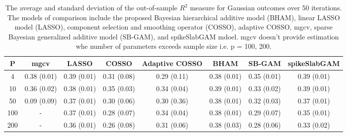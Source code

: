 \begin{table}[ht]
\centering
\begin{tabular}{cccccccc}
  \hline
P & mgcv & LASSO & COSSO & Adaptive COSSO & BHAM & SB-GAM & spikeSlabGAM \\ 
  \hline
  4 & 0.38 (0.01) & 0.39 (0.01) & 0.31 (0.08) & 0.29 (0.11) & 0.38 (0.01) & 0.35 (0.01) & 0.39 (0.01) \\ 
   10 & 0.36 (0.02) & 0.38 (0.01) & 0.35 (0.03) & 0.34 (0.04) & 0.39 (0.01) & 0.33 (0.02) & 0.39 (0.01) \\ 
   50 & 0.09 (0.09) & 0.37 (0.01) & 0.30 (0.06) & 0.30 (0.36) & 0.38 (0.01) & 0.32 (0.03) & 0.37 (0.01) \\ 
  100 & - & 0.37 (0.01) & 0.28 (0.07) & 0.34 (0.04) & 0.38 (0.01) & 0.29 (0.07) & 0.35 (0.01) \\ 
  200 & - & 0.36 (0.01) & 0.26 (0.08) & 0.31 (0.06) & 0.38 (0.03) & 0.28 (0.06) & 0.33 (0.02) \\ 
   \hline
\end{tabular}
\caption{The average and standard deviation of the out-of-sample $R^2$ measure for
    Gaussian outcomes over 50 iterations. The models of comparison include the proposed
    Bayesian hierarchical additive model (BHAM), linear LASSO model (LASSO), component
    selection and smoothing operator (COSSO), adaptive COSSO, mgcv, sparse Bayesian
    generalized additive model (SB-GAM), and spikeSlabGAM mdoel. mgcv doesn't provide estimation
    whe number of parameters exceeds sample size i.e. p = 100, 200.} 
\label{tab:lnr_gaus}
\end{table}
